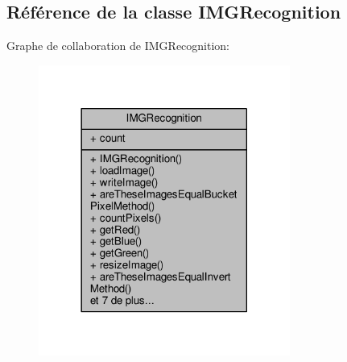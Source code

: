 \hypertarget{classIMGRecognition}{}\subsection{Référence de la classe I\+M\+G\+Recognition}
\label{classIMGRecognition}


Graphe de collaboration de I\+M\+G\+Recognition\+:\nopagebreak
\begin{figure}[H]
\begin{center}
\leavevmode
\includegraphics[width=234pt]{classIMGRecognition__coll__graph}
\end{center}
\end{figure}
